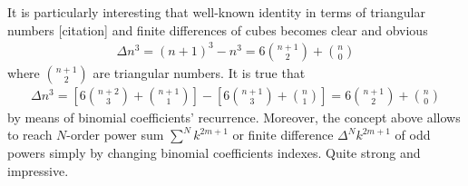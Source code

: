 It is particularly interesting that well-known identity in terms of triangular numbers [citation]
and finite differences of cubes becomes clear and obvious
\begin{align*}
    \Delta n^3 = (n+1)^3 - n^3
    =  6 \binom{n+1}{2} + \binom{n}{0}
\end{align*}
where $\binom{n+1}{2}$ are triangular numbers.
It is true that
\begin{align*}
    \Delta n^3 = \left[ 6 \binom{n+2}{3} + \binom{n+1}{1} \right] - \left[ 6 \binom{n+1}{3} + \binom{n}{1} \right] = 6 \binom{n+1}{2} + \binom{n}{0}
\end{align*}
by means of binomial coefficients' recurrence.
Moreover, the concept above allows to reach $N$-order power sum $\sum^N k^{2m+1}$
or finite difference $\Delta^N k^{2m+1}$ of odd powers simply by changing
binomial coefficients indexes.
Quite strong and impressive.
%
